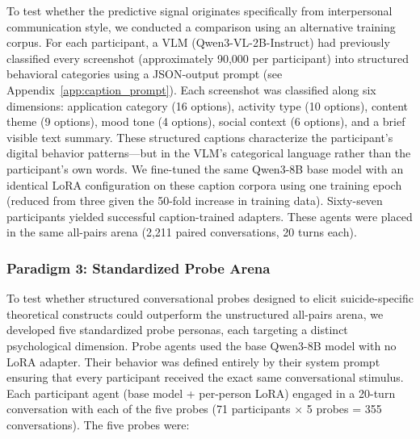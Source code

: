 \documentclass[review,12pt,authoryear]{elsarticle}
\begin{document}
To test whether the predictive signal originates specifically from interpersonal communication style, we conducted a comparison using an alternative training corpus. For each participant, a VLM (Qwen3-VL-2B-Instruct) had previously classified every screenshot (approximately 90,000 per participant) into structured behavioral categories using a JSON-output prompt (see Appendix~\ref{app:caption_prompt}). Each screenshot was classified along six dimensions: application category (16 options), activity type (10 options), content theme (9 options), mood tone (4 options), social context (6 options), and a brief visible text summary. These structured captions characterize the participant's digital behavior patterns---but in the VLM's categorical language rather than the participant's own words. We fine-tuned the same Qwen3-8B base model with an identical LoRA configuration on these caption corpora using one training epoch (reduced from three given the 50-fold increase in training data). Sixty-seven participants yielded successful caption-trained adapters. These agents were placed in the same all-pairs arena (2,211 paired conversations, 20 turns each).

\subsubsection{Paradigm 3: Standardized Probe Arena}

To test whether structured conversational probes designed to elicit suicide-specific theoretical constructs could outperform the unstructured all-pairs arena, we developed five standardized probe personas, each targeting a distinct psychological dimension. Probe agents used the base Qwen3-8B model with no LoRA adapter. Their behavior was defined entirely by their system prompt ensuring that every participant received the exact same conversational stimulus. Each participant agent (base model + per-person LoRA) engaged in a 20-turn conversation with each of the five probes (71 participants $\times$ 5 probes = 355 conversations). The five probes were:
\end{document}
